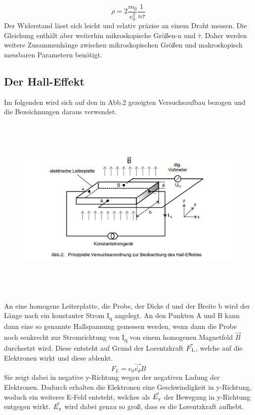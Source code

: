 \documentclass[titlepage=firstcover, captions=tableheading]{scrartcl}
\begin{document}
\begin{equation}
    \rho=2\frac{m_0}{e_0^2}\frac{1}{n\bar{\tau}}
\end{equation}
Der Widerstand lässt sich leicht und relativ präzise an einem Draht messen. Die Gleichung enthält aber weiterhin mikroskopische Größen-n und $\bar{\tau}$. Daher werden weitere Zusammenhänge zwischen mikroskopischen Größen und makroskopisch messbaren Parametern benötigt.

\subsection{Der Hall-Effekt}
Im folgenden wird sich auf den in Abb.2 gezeigten Versuchsaufbau bezogen und die Bezeichnungen daraus verwendet. \\
\begin{figure}[H]
    \centering
    \includegraphics[height=9cm]{Versuchsanordnung_HallEffekt.png}
\end{figure}
An eine homogene Leiterplatte, die Probe, der Dicke d und der Breite b wird der Länge nach ein konstanter Strom I\textsubscript{q} angelegt. An den Punkten A und B kann dann eine so genannte Hallspannung gemessen werden, wenn dann die Probe noch senkrecht zur Stromrichtung von I\textsubscript{q} von einem homogenen Magnetfeld $\vec{B}$ durchsetzt wird. Diese entsteht auf Grund der Lorentzkraft $\vec{F\textsubscript{L}}$, welche auf die Elektronen wirkt und diese ablenkt.
\begin{equation}
    F_L=e_0\vec{\bar{v_d}}B
\end{equation}
Sie zeigt dabei in negative y-Richtung wegen der negativen Ladung der Elektronen. Dadurch erhalten die Elektronen eine Geschwindigkeit in y-Richtung, woduch ein weiteres E-Feld entsteht, welches als $\vec{E\textsubscript{y}}$ der Bewegung in y-Richtung entgegen wirkt. $\vec{E\textsubscript{y}}$ wird dabei genau so groß, dass es die Lorentzkraft aufhebt.
\end{document}
